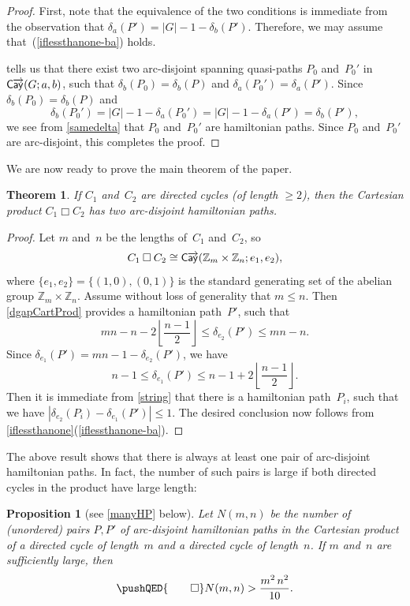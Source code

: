 \documentclass[11pt]{amsart}
\newtheorem{thm}[equation]{Theorem}
\newtheorem{prop}[equation]{Proposition}
\newcommand{\fullcref}[2]{\cref{#1}(\ref{#1-#2})}
\theoremstyle{definition}
\numberwithin{case}{startcases}
\numberwithin{equation}{section}
\newcommand{\cartprod}{\mathbin{\Box}}
\newcommand{\cayd}{\mathop{\mathsf{C}\mkern-1mu\overrightarrow{\mathsf{ay}}}}
\begin{document}
	\begin{proof}
		First, note that the equivalence of the two conditions is immediate from the observation that $\delta_a(P') = |G| - 1 -  \delta_b(P')$. Therefore, we may assume that~(\ref{iflessthanone-ba}) holds.
		
		 tells us that there exist two arc-disjoint spanning quasi-paths $P_0$ and~$P_0'$ in $\cayd(G; a,b)$, such that $\delta_b (P_0) = \delta_b (P)$ and $ \delta_a (P_0') = \delta_a (P')$. Since $\delta_b (P_0) = \delta_b (P)$ and
		\[ \delta_b (P_0') 
		= |G| - 1 - \delta_a (P_0') 
		= |G| - 1 - \delta_a (P')
		= \delta_b (P') , \]
		we see from \cref{samedelta} that $P_0$ and~$P_0'$ are hamiltonian paths.
		Since $P_0$ and~$P_0'$ are arc-disjoint, this completes the proof.
	\end{proof}
	
	We are now ready to prove the main theorem of the paper.
	
	\begin{thm}\label{main}
		If $C_1$ and~$C_2$ are directed cycles \textup(of length $\ge 2$\textup), then the Cartesian product $C_1 \cartprod C_2$ has two arc-disjoint hamiltonian paths.
	\end{thm}
	
	\begin{proof}
		Let $m$ and~$n$ be the lengths of~$C_1$ and~$C_2$, so
		\[ C_1 \cartprod C_2 \cong \cayd(\mathbb{Z}_m \times \mathbb{Z}_n; e_1, e_2) , \] 
		where $\{e_1, e_2\} = \{(1,0), (0,1)\}$ is the standard generating set of the abelian group $\mathbb{Z}_m \times \mathbb{Z}_n$. 
		Assume without loss of generality that $m \le n$. Then \cref{dgapCartProd} provides a hamiltonian path~$P'$, such that
		\[ mn - n - 2\left\lfloor \frac{n-1}{2} \right\rfloor 
		\le \delta_{e_2}(P') \le mn - n . \]
		Since $\delta_{e_1}(P') = mn - 1 - \delta_{e_2}(P')$, we have
		\[ n - 1 \le \delta_{e_1}(P') 
		\le n - 1 + 2\left\lfloor \frac{n-1}{2} \right\rfloor . \]
		Then it is immediate from \cref{string} that there is a hamiltonian path~$P_i$, such that we have $|\delta_{e_2}(P_i) - \delta_{e_1}(P')| \le 1$. The desired conclusion now follows from \fullcref{iflessthanone}{ba}.
	\end{proof}
	
	The above result shows that there is always at least one pair of arc-disjoint hamiltonian paths. In fact, the number of such pairs is large if both directed cycles in the product have large length:
	
	\begin{prop}[see \cref{manyHP} below] \label{ManyInCxC}
		Let $N(m,n)$ be the number of \textup(unordered\textup) pairs $P, P'$ of arc-disjoint hamiltonian paths in the Cartesian product of a directed cycle of length~$m$ and a directed cycle of length~$n$. If $m$ and~$n$ are sufficiently large, then
		\[
		\pushQED{\qed} 
		N(m,n) > \frac{m^2 \, n^2}{10} .
		\qedhere
		\]
	\end{prop}
	
\end{document}
